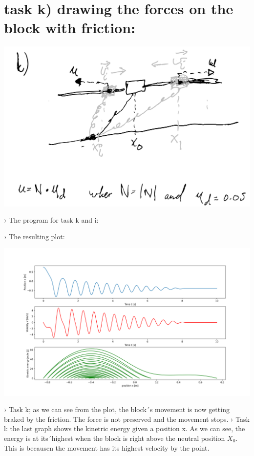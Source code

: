 \documentclass{article}
\begin{document}
    \section*{task k) drawing the forces on the block with friction:}
    \begin{center}
        \includegraphics[scale=0.45]{../k.png}\linebreak
    \end{center}
    \pagebreak
    › The program for task k and i:
    

    › The resulting plot:
    \begin{center}
        \includegraphics[scale=0.45]{../block3.png}\linebreak
    \end{center}

    › Task k; as we can see from the plot, the block´s movement is now getting braked by the friction.
    The force is not preserved and the movement stops. \linebreak
    › Task l: the last graph shows the kinetric energy given a position x. As we can see, the energy is at 
    its´highest when the block is right above the neutral position \(X_0\). This is becausen the movement has 
    its highest velocity by the point.
\end{document}
